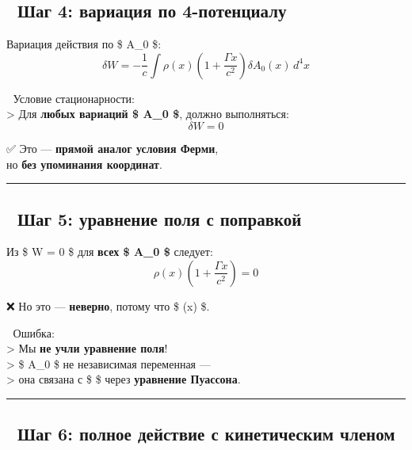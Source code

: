 \documentclass[11pt]{article}
\begin{document}
\subsection{🔹 Шаг 4: вариация по
4-потенциалу}\label{ux448ux430ux433-4-ux432ux430ux440ux438ux430ux446ux438ux44f-ux43fux43e-4-ux43fux43eux442ux435ux43dux446ux438ux430ux43bux443}

Вариация действия по \$ A\_0 \$: \[
\delta W = -\frac{1}{c} \int \rho(x) \left( 1 + \frac{\Gamma x}{c^2} \right) \delta A_0(x) \, d^4x
\]

📌 Условие стационарности:\\
\textgreater{} Для \textbf{любых вариаций \$ \delta A\_0 \$}, должно
выполняться:\\
\[
\boxed{
\delta W = 0
}
\]

✅ Это --- \textbf{прямой аналог условия Ферми},\\
но \textbf{без упоминания координат}.

\begin{center}\rule{0.5\linewidth}{\linethickness}\end{center}

\subsection{🔹 Шаг 5: уравнение поля с
поправкой}\label{ux448ux430ux433-5-ux443ux440ux430ux432ux43dux435ux43dux438ux435-ux43fux43eux43bux44f-ux441-ux43fux43eux43fux440ux430ux432ux43aux43eux439}

Из \$ \delta W = 0 \$ для \textbf{всех \$ \delta A\_0 \$} следует: \[
\boxed{
\rho(x) \left( 1 + \frac{\Gamma x}{c^2} \right) = 0
}
\]

❌ Но это --- \textbf{неверно}, потому что \$ \rho(x)  \$.

📌 Ошибка:\\
\textgreater{} Мы \textbf{не учли уравнение поля}!\\
\textgreater{} \$ A\_0 \$ не независимая переменная ---\\
\textgreater{} она связана с \$ \rho \$ через \textbf{уравнение
Пуассона}.

\begin{center}\rule{0.5\linewidth}{\linethickness}\end{center}

\subsection{🔹 Шаг 6: полное действие с кинетическим
членом}\label{ux448ux430ux433-6-ux43fux43eux43bux43dux43eux435-ux434ux435ux439ux441ux442ux432ux438ux435-ux441-ux43aux438ux43dux435ux442ux438ux447ux435ux441ux43aux438ux43c-ux447ux43bux435ux43dux43eux43c}
\end{document}
